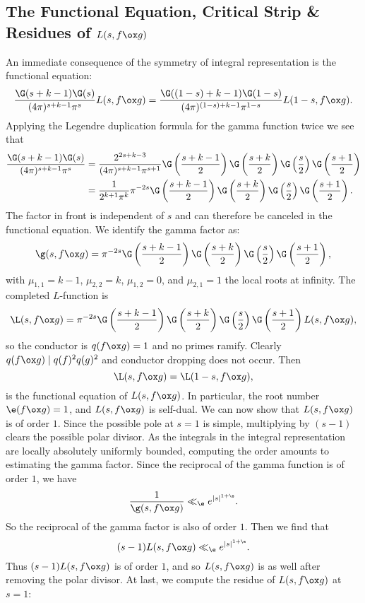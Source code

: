     \subsection*{The Functional Equation, Critical Strip \& Residues of \texorpdfstring{$L(s,f \ox g)$}{L(s,f \ox g)}}
      An immediate consequence of the symmetry of integral representation is the functional equation:
      \[
        \frac{\G(s+k-1)\G(s)}{(4\pi)^{s+k-1}\pi^{s}}L(s,f \ox g) = \frac{\G((1-s)+k-1)\G(1-s)}{(4\pi)^{(1-s)+k-1}\pi^{1-s}}L(1-s,f \ox g).
      \]
      Applying the Legendre duplication formula for the gamma function twice we see that
      \begin{equation}\label{equ:duplication_for_Rankin-Selberg_gamma_factor}
        \begin{aligned}
          \frac{\G(s+k-1)\G(s)}{(4\pi)^{s+k-1}\pi^{s}} &= \frac{2^{2s+k-3}}{(4\pi)^{s+k-1}\pi^{s+1}}\G\left(\frac{s+k-1}{2}\right)\G\left(\frac{s+k}{2}\right)\G\left(\frac{s}{2}\right)\G\left(\frac{s+1}{2}\right) \\
          &= \frac{1}{2^{k+1}\pi^{k}}\pi^{-2s}\G\left(\frac{s+k-1}{2}\right)\G\left(\frac{s+k}{2}\right)\G\left(\frac{s}{2}\right)\G\left(\frac{s+1}{2}\right).
        \end{aligned}
      \end{equation}
      The factor in front is independent of $s$ and can therefore be canceled in the functional equation. We identify the gamma factor as:
      \[
        \g(s,f \ox g) = \pi^{-2s}\G\left(\frac{s+k-1}{2}\right)\G\left(\frac{s+k}{2}\right)\G\left(\frac{s}{2}\right)\G\left(\frac{s+1}{2}\right),
      \]
      with $\mu_{1,1} = k-1$, $\mu_{2,2} = k$, $\mu_{1,2} = 0$, and $\mu_{2,1} = 1$ the local roots at infinity. The completed $L$-function is
      \[
        \L(s,f \ox g) = \pi^{-2s}\G\left(\frac{s+k-1}{2}\right)\G\left(\frac{s+k}{2}\right)\G\left(\frac{s}{2}\right)\G\left(\frac{s+1}{2}\right)L(s,f \ox g),
      \]
      so the conductor is $q(f \ox g) = 1$ and no primes ramify. Clearly $q(f \ox g) \mid q(f)^{2}q(g)^{2}$ and conductor dropping does not occur. Then
      \[
        \L(s,f \ox g) = \L(1-s,f \ox g),
      \]
      is the functional equation of $L(s,f \ox g)$. In particular, the root number $\e(f \ox g) = 1$, and $L(s,f \ox g)$ is self-dual. We can now show that $L(s,f \ox g)$ is of order $1$. Since the possible pole at $s = 1$ is simple, multiplying by $(s-1)$ clears the possible polar divisor. As the integrals in the integral representation are locally absolutely uniformly bounded, computing the order amounts to estimating the gamma factor. Since the reciprocal of the gamma function is of order $1$, we have
      \[
        \frac{1}{\g(s,f \ox g)} \ll_{\e} e^{|s|^{1+\e}}.
      \]
      So the reciprocal of the gamma factor is also of order $1$. Then we find that
      \[
        (s-1)L(s,f \ox g) \ll_{\e} e^{|s|^{1+\e}}.
      \]
      Thus $(s-1)L(s,f \ox g)$ is of order $1$, and so $L(s,f \ox g)$ is as well after removing the polar divisor. At last, we compute the residue of $L(s,f \ox g)$ at $s = 1$:

